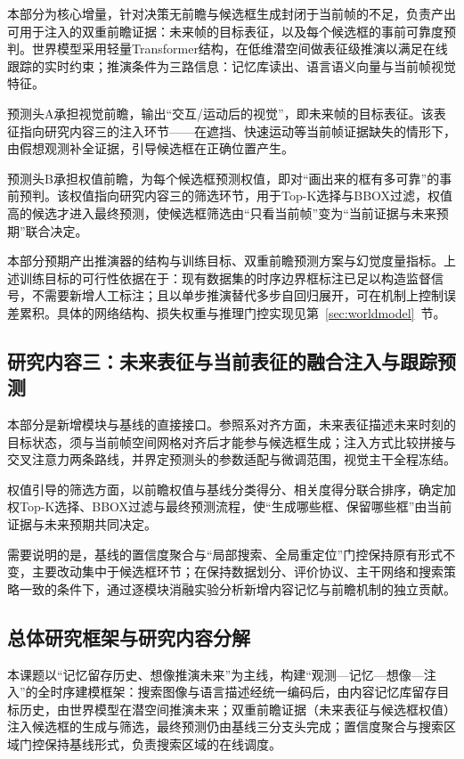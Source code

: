 本部分为核心增量，针对决策无前瞻与候选框生成封闭于当前帧的不足，负责产出可用于注入的双重前瞻证据：未来帧的目标表征，以及每个候选框的事前可靠度预判。世界模型采用轻量Transformer结构，在低维潜空间做表征级推演以满足在线跟踪的实时约束；推演条件为三路信息：记忆库读出、语言语义向量与当前帧视觉特征。

预测头A承担视觉前瞻，输出“交互/运动后的视觉”，即未来帧的目标表征。该表征指向研究内容三的注入环节——在遮挡、快速运动等当前帧证据缺失的情形下，由假想观测补全证据，引导候选框在正确位置产生。

预测头B承担权值前瞻，为每个候选框预测权值，即对“画出来的框有多可靠”的事前预判。该权值指向研究内容三的筛选环节，用于Top-K选择与BBOX过滤，权值高的候选才进入最终预测，使候选框筛选由“只看当前帧”变为“当前证据与未来预期”联合决定。

本部分预期产出推演器的结构与训练目标、双重前瞻预测方案与幻觉度量指标。上述训练目标的可行性依据在于：现有数据集的时序边界框标注已足以构造监督信号，不需要新增人工标注；且以单步推演替代多步自回归展开，可在机制上控制误差累积。具体的网络结构、损失权重与推理门控实现见第~\ref{sec:worldmodel}~节。

\subsection{研究内容三：未来表征与当前表征的融合注入与跟踪预测}

本部分是新增模块与基线的直接接口。参照系对齐方面，未来表征描述未来时刻的目标状态，须与当前帧空间网格对齐后才能参与候选框生成；注入方式比较拼接与交叉注意力两条路线，并界定预测头的参数适配与微调范围，视觉主干全程冻结。

权值引导的筛选方面，以前瞻权值与基线分类得分、相关度得分联合排序，确定加权Top-K选择、BBOX过滤与最终预测流程，使“生成哪些框、保留哪些框”由当前证据与未来预期共同决定。

需要说明的是，基线的置信度聚合与“局部搜索、全局重定位”门控保持原有形式不变，主要改动集中于候选框环节；在保持数据划分、评价协议、主干网络和搜索策略一致的条件下，通过逐模块消融实验分析新增内容记忆与前瞻机制的独立贡献。

\subsection{总体研究框架与研究内容分解}
\label{sec:decomp}

本课题以“记忆留存历史、想像推演未来”为主线，构建“观测—记忆—想像—注入”的全时序建模框架：搜索图像与语言描述经统一编码后，由内容记忆库留存目标历史，由世界模型在潜空间推演未来；双重前瞻证据（未来表征与候选框权值）注入候选框的生成与筛选，最终预测仍由基线三分支头完成；置信度聚合与搜索区域门控保持基线形式，负责搜索区域的在线调度。


